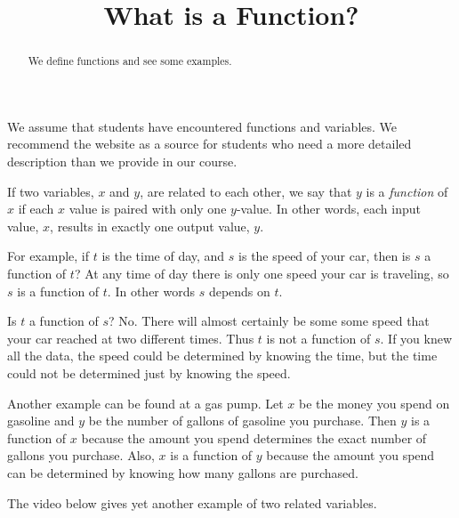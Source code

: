 \documentclass{ximera}
\title{What is a Function?}
\begin{document}
\begin{abstract}
We define functions and see some examples.
\end{abstract}
\maketitle

We assume that students have encountered functions and variables. We recommend the website  as a source for students who need a more detailed description than we provide in our course. 

If two variables, $x$ and $y$, are related to each other, we say that $y$ is a \emph{function} of $x$ if each $x$ value is paired with only one $y$-value. In other words, each input value, $x$, results in exactly one output value, $y$.

For example, if $t$ is the time of day, and $s$ is the speed of your car, then is $s$ a function of $t$? At any time of day there is only one speed your car is traveling, so $s$ is a function of $t$. In other words $s$ depends on $t$.

Is $t$ a function of $s$? No. There will almost certainly be some some speed that your car reached at two different times. Thus $t$ is not a function of $s$. If you knew all the data, the speed could be determined by knowing the time, but the time could not be determined just by knowing the speed.

Another example can be found at a gas pump. Let $x$ be the money you spend on gasoline and $y$ be the number of gallons of gasoline you purchase. Then $y$ is a function of $x$ because the amount you spend determines the exact number of gallons you purchase. Also, $x$ is a function of $y$ because the amount you spend can be determined by knowing how many gallons are purchased.

The video below gives yet another example of two related variables.
\end{document}
